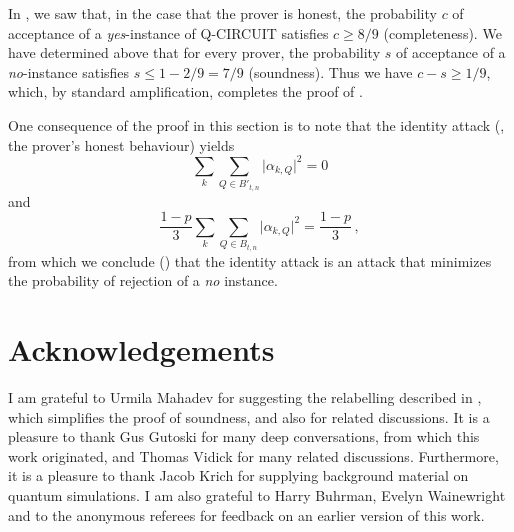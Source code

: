 \documentclass{toc}
\providecommand{\abs}[1]{\lvert#1\rvert}
\begin{document}
In , we saw that, in the case that the prover is honest, the probability $c$ of acceptance of a \emph{yes}-instance of \textsf{Q-CIRCUIT} satisfies  $c\geq {8}/{9}$ (completeness). We have determined above that for every prover,  the probability $s$ of acceptance of a \emph{no}-instance satisfies $s\leq 1-{2}/{9} = {7}/{9}$ (soundness). Thus we have $c-s \geq {1}/{9}$, which, by standard amplification,  completes the proof of .

One consequence of the proof in this section is to note that the identity attack (\ie, the prover's honest  behaviour)  yields%
\begin{equation}
\sum_k \sum_{Q \in B'_{t,n}} \abs{\alpha_{k,Q}}^2 =0
\end{equation}
and
\begin{equation}
  \frac{1-p}{3}  \sum_k\sum_{Q \in B_{t,n}} \abs{\alpha_{k,Q}}^2 = \frac{1-p}{3}\,,
  \end{equation}
from which we conclude () that the identity attack is an attack that minimizes the  probability of rejection of a \emph{no} instance.


%
%
%
%

%













%






%




\section*{Acknowledgements}
I am grateful to Urmila Mahadev for suggesting the relabelling described in , which simplifies the proof of soundness, and also for related discussions.
It is a pleasure to thank Gus Gutoski for many deep conversations, from which this work originated, and Thomas Vidick for many related discussions.
Furthermore, it is a pleasure to thank  Jacob Krich for supplying background material on quantum simulations. I am also grateful to  Harry Buhrman,  Evelyn Wainewright and to the anonymous referees for feedback on an earlier version of this work.
%
\end{document}
